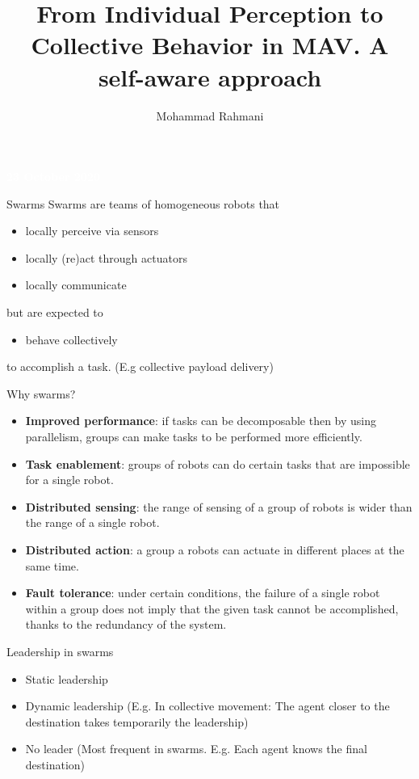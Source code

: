 \documentclass[unknownkeysallowed]{beamer}
\title{From Individual Perception to Collective Behavior in MAV. A self-aware approach}
\author{Mohammad Rahmani}
\institute{Pervasive Computing Group}
\begin{document}
	\begin{frame}
		\date{}
		\maketitle
		\textcolor{white}{\textbf{23 October 2020}}
	\end{frame}
	
	
	\begin{frame}{Swarms}
		Swarms are teams of homogeneous robots that
		\begin{itemize} 
			\item locally perceive via sensors
			\item locally (re)act through actuators
			\item locally communicate
		\end{itemize}
		but are expected to 
		\begin{itemize}
			\item behave collectively
		\end{itemize}
	to accomplish a task. (E.g collective payload delivery)
	\end{frame}

	\begin{frame}{Why swarms?}
		\begin{itemize}
			\item \textbf{Improved performance}: if tasks can be decomposable then by using parallelism, groups can make tasks to be performed more efficiently.
			\item \textbf{Task enablement}: groups of robots can do certain tasks that are impossible for a single robot.
			\item \textbf{Distributed sensing}: the range of sensing of a group of robots is wider than the range of a single robot.
			\item \textbf{Distributed action}: a group a robots can actuate in different places at the same time.
			\item \textbf{Fault tolerance}: under certain conditions, the failure of a single robot within a group does not imply that the given task cannot be accomplished, thanks to the redundancy of the system.
		\end{itemize}
	\end{frame}

	\begin{frame}{Leadership in swarms}
		\begin{itemize}
			\item Static leadership
			\item Dynamic leadership (E.g. In collective movement: The agent closer to the destination takes temporarily the leadership)
			\item No leader (Most frequent in swarms. E.g. Each agent knows the final destination)
		\end{itemize}
	\end{frame}
\end{document}
